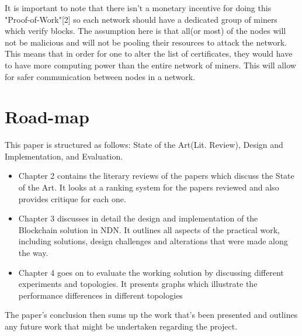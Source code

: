  It is important to note that there isn't a monetary incentive for doing this "Proof-of-Work"[2] so each network should have a dedicated group of miners which verify blocks. The assumption here is that all(or most) of the nodes will not be malicious and will not be pooling their resources to attack the network. This means that in order for one to alter the list of certificates, they would have to have more computing power than the entire network of miners. This will allow for safer communication between nodes in a network. 
\vfill
\section{Road-map}

This paper is structured as follows: State of the Art(Lit. Review), Design and Implementation, and Evaluation.
\begin{itemize}
\item Chapter 2 contains the literary reviews of the papers which discuss the State of the Art. It looks at a ranking system for the papers reviewed and also provides critique for each one. 

\item Chapter 3 discusses in detail the design and implementation of the Blockchain solution in NDN. It outlines all aspects of the practical work, including solutions, design challenges and alterations that were made along the way.

\item Chapter 4 goes on to evaluate the working solution by discussing different experiments and topologies. It presents graphs which illustrate the performance differences in different topologies
\end{itemize}
The paper's conclusion then sums up the work that's been presented and outlines any future work that might be undertaken regarding the project.